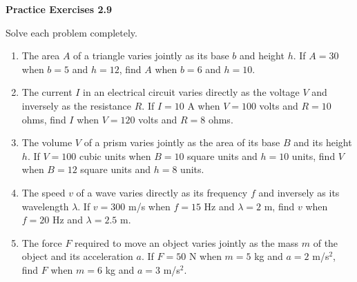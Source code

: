 \vspace{0.3ex}
\noindent\textbf{Practice Exercises 2.9}

\vspace{0.2ex}

Solve each problem completely.
\begin{enumerate}[noitemsep, label = \color{blue}\arabic*. ]
\item The area \(A\) of a triangle varies jointly as its base \(b\) and height \(h\). If \(A = 30\) when \(b = 5\) and \(h = 12\), find \(A\) when \(b = 6\) and \(h = 10\).

\item The current \(I\) in an electrical circuit varies directly as the voltage \(V\) and inversely as the resistance \(R\). If \(I = 10\) A when \(V = 100\) volts and \(R = 10\) ohms, find \(I\) when \(V = 120\) volts and \(R = 8\) ohms.
  
\item The volume \(V\) of a prism varies jointly as the area of its base \(B\) and its height \(h\). If \(V = 100\) cubic units when \(B = 10\) square units and \(h = 10\) units, find \(V\) when \(B = 12\) square units and \(h = 8\) units.

\item The speed \(v\) of a wave varies directly as its frequency \(f\) and inversely as its wavelength \(\lambda\). If \(v = 300\) m/s when \(f = 15\) Hz and \(\lambda = 2\) m, find \(v\) when \(f = 20\) Hz and \(\lambda = 2.5\) m.
  
    \item The force \(F\) required to move an object varies jointly as the mass \(m\) of the object and its acceleration \(a\). If \(F = 50\) N when \(m = 5\) kg and \(a = 2\) m/s\(^2\), find \(F\) when \(m = 6\) kg and \(a = 3\) m/s\(^2\).


\end{enumerate}
